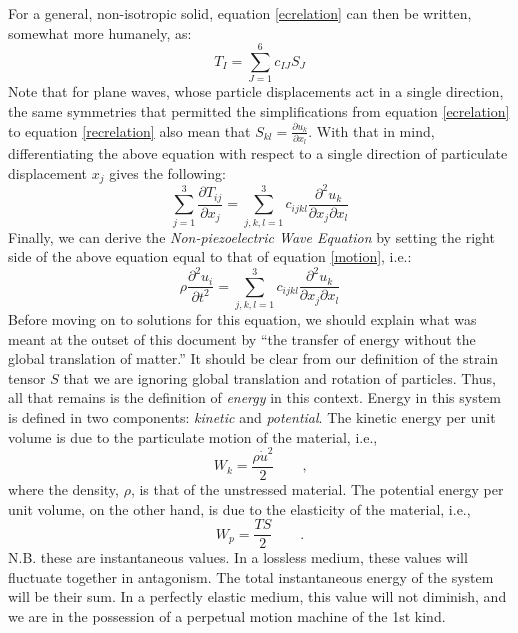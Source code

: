 \documentclass[a4paper,10pt]{report}
\numberwithin{equation}{section}
\begin{document}
For a general, non-isotropic solid, equation \eqref{ecrelation} can then be written, somewhat more humanely, as:
\begin{equation}\label{recrelation}
 T_{I} = \sum_{J=1}^{6} c_{IJ} S_{J}
\end{equation}
Note that for plane waves, whose particle displacements act in a single direction, the same symmetries that permitted the simplifications from equation \eqref{ecrelation} to equation \eqref{recrelation} also mean that $S_{kl} =\frac{\partial u_k}{\partial x_l}$. With that in mind, differentiating the above equation with respect to a single direction of particulate displacement $x_j$ gives the following\cite{Ballantine1997}:
\begin{equation}
 \sum_{j=1}^3 \frac{\partial T_{ij}}{\partial x_{j}} = \sum_{j,k,l=1}^3 c_{ijkl}\frac{\partial^2 u_k}{\partial x_j \partial x_l}
\end{equation}
Finally, we can derive the \emph{Non-piezoelectric Wave Equation} by setting the right side of the above equation equal to that of equation \eqref{motion}, i.e.:
\begin{equation}\label{npwaveq}
 \rho\frac{\partial^2u_i}{\partial t^2} = \sum_{j,k,l=1}^3 c_{ijkl} \frac{\partial^2 u_k}{\partial x_j \partial x_l}
\end{equation}
Before moving on to solutions for this equation, we should explain what was meant at the outset of this document by ``the transfer of energy without the global translation of matter.'' It should be clear from our definition of the strain tensor $S$ that we are ignoring global translation and rotation of particles. Thus, all that remains is the definition of \emph{energy} in this context. Energy in this system is defined in two components: \emph{kinetic} and \emph{potential}. The kinetic energy per unit volume is due to the particulate motion of the material, i.e.\cite[p.~6]{Kino1987},
\begin{equation}\label{kinetic}
W_k = \frac{\rho \dot{u}^2}{2}\qquad \text{,}
\end{equation}
where the density, $\rho$, is that of the unstressed material. The potential energy per unit volume, on the other hand, is due to the elasticity of the material, i.e., \cite[p.~6]{Kino1987}
\begin{equation}\label{potential}
 W_p = \frac{TS}{2}\qquad \text{.}
\end{equation}
N.B. these are instantaneous values. In a lossless medium, these values will fluctuate together in antagonism. The total instantaneous energy of the system will be their sum. In a perfectly elastic medium, this value will not diminish, and we are in the possession of a perpetual motion machine of the 1st kind.
\end{document}
